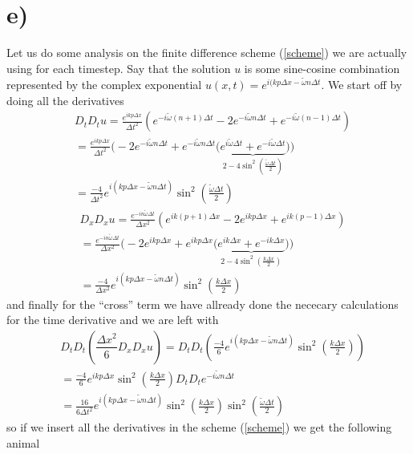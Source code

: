 \documentclass[a4paper,english, 10pt, twoside]{article}
\begin{document}
\section*{e)}
Let us do some analysis on the finite difference scheme (\ref{scheme}) we are actually using for each timestep. Say that the 
solution $u$ is some sine-cosine combination represented by the complex exponential $u(x,t) = e^{i(kp\Delta x - \tilde\omega n\Delta t}$. 
We start off by doing all the derivatives
\begin{align*}
 &D_tD_tu = \frac{e^{ikp\Delta x}}{\Delta t^2}\left(e^{-i\tilde\omega (n+1)\Delta t} -2e^{-i\tilde\omega n\Delta t} + 
 e^{-i\tilde\omega (n-1)\Delta t} \right) \\
 &= \frac{e^{ikp\Delta x}}{\Delta t^2}\big(-2e^{-i\tilde\omega n\Delta t} +e^{-i\tilde\omega n\Delta t}\big(
 \underbrace{e^{i\tilde\omega\Delta t}+e^{-i\tilde\omega\Delta t}}_{2-4\sin^2(\frac{\tilde\omega\Delta t}{2})}\big)\big) \\
 &= \frac{-4}{\Delta t^2}e^{i(kp\Delta x - \tilde\omega n\Delta t)}\sin^2\left(\frac{\tilde\omega\Delta t}{2}\right)
\end{align*}
\begin{align*}
 &D_xD_xu = \frac{e^{-in\tilde\omega\Delta t}}{\Delta x^2}\left(e^{ik(p+1)\Delta x} -2e^{ikp\Delta x} + e^{ik(p-1)\Delta x} \right) \\
&= \frac{e^{-in\tilde\omega\Delta t}}{\Delta x^2}\big(-2e^{ikp\Delta x} + e^{ikp\Delta x}\big( \underbrace{e^{ik\Delta x}+
e^{-ik\Delta x}}_{2-4\sin^2(\frac{k\Delta x}{2})}\big) \big) \\
&= \frac{-4}{\Delta x^2}e^{i(kp\Delta x - \tilde\omega n\Delta t)}\sin^2\left(\frac{k\Delta x}{2}\right)
 \end{align*}
and finally for the ``cross'' term we have allready done the nececary calculations for the time derivative and we are left with
\begin{align*}
 &D_tD_t(\dfrac{\Delta x^2}{6}D_xD_xu) = D_tD_t\left(\frac{-4}{6}e^{i(kp\Delta x - \tilde\omega n\Delta t)}\sin^2\left(\frac{k\Delta x}{2}\right) \right) \\
 &=\frac{-4}{6}e^{ikp\Delta x}\sin^2\left(\frac{k\Delta x}{2}\right) D_tD_te^{-i\tilde\omega n\Delta t} \\
 &= \frac{16}{6\Delta t^2}e^{i(kp\Delta x - \tilde\omega n\Delta t)}\sin^2\left(\frac{k\Delta x}{2}\right)
 \sin^2\left(\frac{\tilde\omega\Delta t}{2}\right)
\end{align*}
so if we insert all the derivatives in the scheme (\ref{scheme}) we get the following animal
\end{document}
